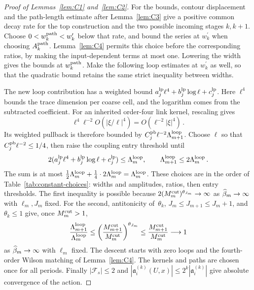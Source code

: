 \begin{proof}[Proof of Lemmas~\ref{lem:C1} and~\ref{lem:C2}]
For the bounds, contour displacement and the path-length estimate after Lemma~\ref{lem:C3} give a positive common decay rate for the top construction and the two possible incoming stages $k,k+1$. Choose $0<w_k^{\rm path}<w_k^\prime$ below that rate, and bound the series at $w_k^\prime$ when choosing $A_k^{\rm path}$. Lemma~\ref{lem:C4} permits this choice before the corresponding ratios, by making the input-dependent terms at most one. Lowering the width gives the bounds at $w_k^{\rm path}$. Make the following loop estimates at $w_k^\prime$ as well, so that the quadratic bound retains the same strict inequality between widths.

The new loop contribution has a weighted bound $a_j^{\rm lp}\ell^4+b_j^{\rm lp}\log\ell+c_j^{\rm lp}$. Here $\ell^4$ bounds the trace dimension per coarse cell, and the logarithm comes from the subtracted coefficient. For an inherited order-four link kernel, rescaling gives
\begin{equation*}
\ell^4\ell^{-2}O(|\xi/\ell|^4)=O(\ell^{-2}|\xi|^4)\,.
\end{equation*}
Its weighted pullback is therefore bounded by $C_j^{\rm pb}\ell^{-2}\Lambda_{m+1}^{\rm loop}$. Choose $\ell$ so that $C_j^{\rm pb}\ell^{-2}\le1/4$, then raise the coupling entry threshold until
\begin{equation*}
2(a_j^{\rm lp}\ell^4+b_j^{\rm lp}\log\ell+c_j^{\rm lp})\le\Lambda_m^{\rm loop},\qquad
\Lambda_{m+1}^{\rm loop}\le2\Lambda_m^{\rm loop}\,.
\end{equation*}
The sum is at most $\tfrac12\Lambda_m^{\rm loop}+\tfrac14\cdot2\Lambda_m^{\rm loop}=\Lambda_m^{\rm loop}$. These choices are in the order of Table~\ref{tab:constant-choices}: widths and amplitudes, ratios, then entry thresholds. The first inequality is possible because $2(M^{\mathrm{cut}}_m)^{\theta_{J_m}}\to\infty$ as $\widehat{\beta}_m\to\infty$ with $\ell_m,J_m$ fixed. For the second, antitonicity of~$\theta_k$, $J_m\le J_{m+1}\le J_m+1$, and $\theta_k\le1$ give, once $M^{\mathrm{cut}}_m>1$,
\begin{equation*}
\frac{\Lambda_{m+1}^{\rm loop}}{\Lambda_m^{\rm loop}}
\le\left(\frac{M^{\mathrm{cut}}_{m+1}}{M^{\mathrm{cut}}_m}\right)^{\theta_{J_m}}
\le\frac{M^{\mathrm{cut}}_{m+1}}{M^{\mathrm{cut}}_m}\longrightarrow1
\end{equation*}
as $\widehat{\beta}_m\to\infty$ with $\ell_m$ fixed. The descent starts with zero loops and the fourth-order Wilson matching of Lemma~\ref{lem:C4}. The kernels and paths are chosen once for all periods. Finally $|\mathcal F_s|\le2$ and $|\mathfrak a_i^{(k)}(U,x)|\le2^k|\mathfrak a_i^{(k)}|$ give absolute convergence of the action.
\end{proof}
